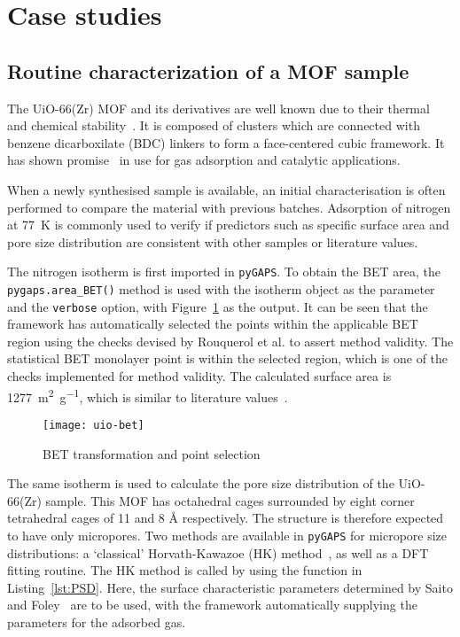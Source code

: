
\section{Case studies}

\subsection{Routine characterization of a MOF sample}

The UiO-66(Zr) MOF and its derivatives are well known due to their thermal and chemical 
stability~\cite{cavkaNewZirconiumInorganic2008}. It is composed of
 clusters which are connected with benzene dicarboxilate (BDC) linkers to form
a face-centered cubic framework. It has shown promise~\cite{wiersumEvaluationUiO66GasBased2011}
in use for gas adsorption and catalytic applications.

When a newly synthesised sample is available, an initial characterisation is often performed
to compare the material with previous batches. Adsorption of nitrogen at \SI{77}{\kelvin}
is commonly used to verify if predictors such as specific surface area and pore size 
distribution are consistent with other samples or literature values. 

The nitrogen isotherm is first imported in \texttt{pyGAPS}. To obtain the BET 
area, the \lstinline{pygaps.area_BET()} method is used with the isotherm object as the 
parameter and the \lstinline{verbose} option, with Figure~\ref{fig:uiobet} as the output.
It can be seen that the framework has automatically selected the points within the 
applicable BET region using the checks devised by Rouquerol et al.
\cite{rouquerolAdsorptionPowdersPorous2013} to assert method validity. 
The statistical BET monolayer point is within
the selected region, which is one of the checks implemented for method validity.
The calculated surface area is \SI{1277}{\metre^2\per\gram}, which is similar to
literature values~\cite{wiersumEvaluationUiO66GasBased2011, 
valenzanoDisclosingComplexStructure2011}.

\begin{figure}[ht]
    \texttt{[image: uio-bet]}
    \caption{BET transformation and point selection}%
    \label{fig:uiobet}
\end{figure}

The same isotherm is used to calculate the pore size distribution of the UiO-66(Zr) sample.
This MOF has octahedral cages surrounded by eight corner 
tetrahedral cages of 11 and 8 \si{\angstrom} respectively. 
The structure is therefore expected to have only 
micropores. Two methods are available in \texttt{pyGAPS} for micropore size distributions:
a `classical' Horvath-Kawazoe (HK) method~\cite{horvathMethodCalculationEffective1983}, 
as well as a DFT fitting routine.
The HK method is called by using the function in Listing~\ref{lst:PSD}.
Here, the surface characteristic parameters determined by Saito and 
Foley~\cite{saitoCurvatureParametricSensitivity1991} are to
be used, with the framework automatically supplying the parameters for the adsorbed gas. 

